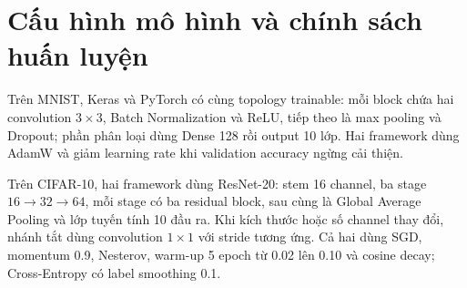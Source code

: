 \documentclass[12pt,a4paper]{report}
\begin{document}
\section{Cấu hình mô hình và chính sách huấn luyện}
\begin{table}[H]
\centering
\caption{Cấu hình CNN NumPy theo từng dataset}
\label{tab:numpy_config}
\end{table}

\begin{table}[H]
\centering
\caption{Kiến trúc và cấu hình hai framework}
\label{tab:framework_config}
\end{table}

Trên MNIST, Keras và PyTorch có cùng topology trainable: mỗi block chứa hai
convolution $3\times3$, Batch Normalization và ReLU, tiếp theo là max pooling và
Dropout; phần phân loại dùng Dense 128 rồi output 10 lớp. Hai framework dùng
AdamW và giảm learning rate khi validation accuracy ngừng cải thiện.

Trên CIFAR-10, hai framework dùng ResNet-20: stem 16 channel, ba stage
$16\to32\to64$, mỗi stage có ba residual block, sau cùng là Global Average
Pooling và lớp tuyến tính 10 đầu ra. Khi kích thước hoặc số channel thay đổi,
nhánh tắt dùng convolution $1\times1$ với stride tương ứng. Cả hai dùng SGD,
momentum 0.9, Nesterov, warm-up 5 epoch từ 0.02 lên 0.10 và cosine decay;
Cross-Entropy có label smoothing 0.1.
\end{document}
